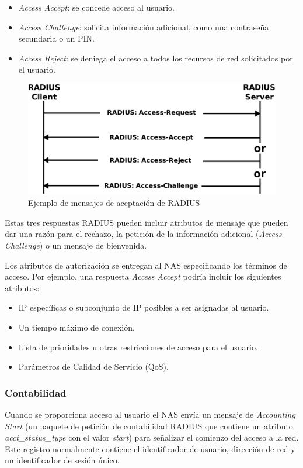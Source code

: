 \begin{itemize}
\item \emph{Access Accept}: se concede acceso al usuario.
\item \emph{Access Challenge}: solicita información adicional, como una contraseña secundaria o un PIN.
\item \emph{Access Reject}: se deniega el acceso a todos los recursos de red solicitados por el usuario.
\end{itemize}

\begin{figure}[!t]
\begin{center}
\includegraphics[width=0.75\linewidth]{./3_Tecnologias/Img/RADIUSAccept.png}
\end{center}
\caption{Ejemplo de mensajes de aceptación de RADIUS}
\label{RADIUSAccept}
\end{figure}

Estas tres respuestas RADIUS pueden incluir atributos de mensaje que pueden dar una razón para el rechazo, la petición de la información adicional (\emph{Access Challenge}) o un mensaje de bienvenida.

Los atributos de autorización se entregan al NAS especificando los términos de acceso. Por ejemplo, una respuesta \emph{Access Accept} podría incluir los siguientes atributos:

\begin{itemize}
\item IP específicas o subconjunto de IP posibles a ser asignadas al usuario.
\item Un tiempo máximo de conexión.
\item Lista de prioridades u otras restricciones de acceso para el usuario.
\item Parámetros de Calidad de Servicio (\acrshort{QoS}).
\end{itemize}

\subsubsection{Contabilidad}
Cuando se proporciona acceso al usuario el NAS envía un mensaje de \emph{Accounting Start} (un paquete de petición de contabilidad RADIUS que contiene un atributo \emph{acct\_status\_type} con el valor \emph{start}) para señalizar el comienzo del acceso a la red. Este registro normalmente contiene el identificador de usuario, dirección de red y un identificador de sesión único.

